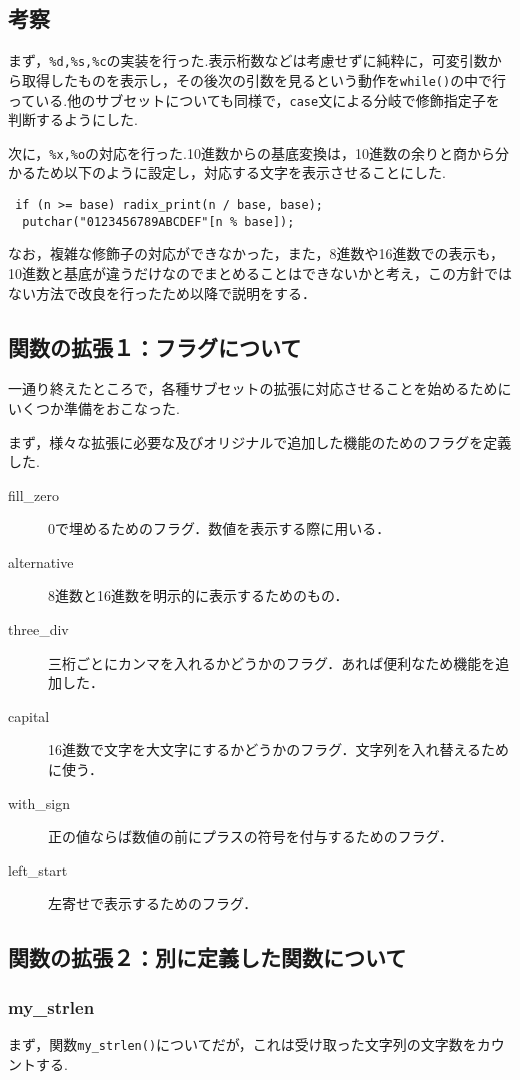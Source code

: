 \documentclass[a4j,11pt]{jarticle}
\begin{document}
  \subsection{考察}
まず，\verb|%d,%s,%c|の実装を行った.表示桁数などは考慮せずに純粋に，可変引数から取得したものを表示し，その後次の引数を見るという動作を\verb|while()|の中で行っている.他のサブセットについても同様で，\verb|case|文による分岐で修飾指定子を判断するようにした.

次に，\verb|%x,%o|の対応を行った.10進数からの基底変換は，10進数の余りと商から分かるため以下のように設定し，対応する文字を表示させることにした.
\begin{verbatim}
 if (n >= base) radix_print(n / base, base);
  putchar("0123456789ABCDEF"[n % base]);
\end{verbatim}
なお，複雑な修飾子の対応ができなかった，また，8進数や16進数での表示も，10進数と基底が違うだけなのでまとめることはできないかと考え，この方針ではない方法で改良を行ったため以降で説明をする．
\subsection{関数の拡張１：フラグについて}
一通り終えたところで，各種サブセットの拡張に対応させることを始めるためにいくつか準備をおこなった.

まず，様々な拡張に必要な及びオリジナルで追加した機能のためのフラグを定義した.
\begin{description}
  \item[fill\_zero]0で埋めるためのフラグ．数値を表示する際に用いる．
  \item[alternative]8進数と16進数を明示的に表示するためのもの．
  \item[three\_div]三桁ごとにカンマを入れるかどうかのフラグ．あれば便利なため機能を追加した．
  \item[capital]16進数で文字を大文字にするかどうかのフラグ．文字列を入れ替えるために使う．
  \item[with\_sign]正の値ならば数値の前にプラスの符号を付与するためのフラグ．
  \item[left\_start]左寄せで表示するためのフラグ．
\end{description}
\subsection{関数の拡張２：別に定義した関数について}
\subsubsection{my\_strlen}
まず，関数\verb|my_strlen()|についてだが，これは受け取った文字列の文字数をカウントする.
\end{document}
